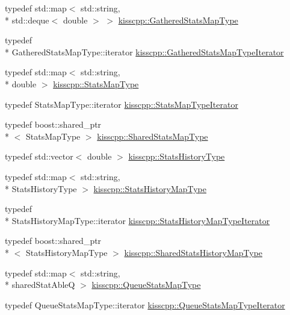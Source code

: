 \begin{DoxyCompactItemize}
\item 
typedef std\-::map$<$ std\-::string, \\*
std\-::deque$<$ double $>$ $>$ \hyperlink{a00089_a4c76f7ad5a35f6bd51154a961f9c0d7d}{kisscpp\-::\-Gathered\-Stats\-Map\-Type}
\item 
typedef \\*
Gathered\-Stats\-Map\-Type\-::iterator \hyperlink{a00089_a53ec1a09258369be8737e6ec2f93961c}{kisscpp\-::\-Gathered\-Stats\-Map\-Type\-Iterator}
\item 
typedef std\-::map$<$ std\-::string, \\*
double $>$ \hyperlink{a00089_adb9e851c391ea02ff8f961f1cd37ed8c}{kisscpp\-::\-Stats\-Map\-Type}
\item 
typedef Stats\-Map\-Type\-::iterator \hyperlink{a00089_a674afcb960d0097e39ef66ab83af14be}{kisscpp\-::\-Stats\-Map\-Type\-Iterator}
\item 
typedef boost\-::shared\-\_\-ptr\\*
$<$ Stats\-Map\-Type $>$ \hyperlink{a00089_aec223e8bce5f3988c62ceb0ccad11a68}{kisscpp\-::\-Shared\-Stats\-Map\-Type}
\item 
typedef std\-::vector$<$ double $>$ \hyperlink{a00089_a4629097b5a6697a8a1eefd9ac5b0a2b6}{kisscpp\-::\-Stats\-History\-Type}
\item 
typedef std\-::map$<$ std\-::string, \\*
Stats\-History\-Type $>$ \hyperlink{a00089_a8dbb864ea5d1e1fae0d3a1435bd295e7}{kisscpp\-::\-Stats\-History\-Map\-Type}
\item 
typedef \\*
Stats\-History\-Map\-Type\-::iterator \hyperlink{a00089_ae45d7146f3abe3c95364c6ea280f7487}{kisscpp\-::\-Stats\-History\-Map\-Type\-Iterator}
\item 
typedef boost\-::shared\-\_\-ptr\\*
$<$ Stats\-History\-Map\-Type $>$ \hyperlink{a00089_afa626c76d3dca5d5e1be4146f211fefa}{kisscpp\-::\-Shared\-Stats\-History\-Map\-Type}
\item 
typedef std\-::map$<$ std\-::string, \\*
shared\-Stat\-Able\-Q $>$ \hyperlink{a00089_a36c7aee4be6fad3cc8ab5ec896e1f9a5}{kisscpp\-::\-Queue\-Stats\-Map\-Type}
\item 
typedef Queue\-Stats\-Map\-Type\-::iterator \hyperlink{a00089_a108455a00c9a8ea1f3416c5cab767bbe}{kisscpp\-::\-Queue\-Stats\-Map\-Type\-Iterator}
\end{DoxyCompactItemize}
